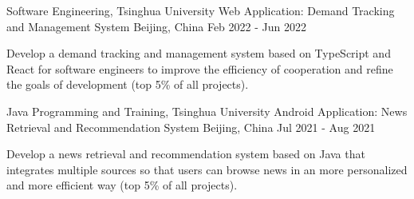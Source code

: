 

\begin{cventries}

  \cventry
    {Software Engineering, Tsinghua University} %
    {Web Application: Demand Tracking and Management System} %
    {Beijing, China} %
    {Feb 2022 - Jun 2022} %
    {
      \begin{cvitems} %
        \item {Develop a demand tracking and management system based on TypeScript and React for software engineers to improve the efficiency of cooperation and refine the goals of development (top 5\% of all projects).}
      \end{cvitems}
    }

  \cventry
    {Java Programming and Training, Tsinghua University} %
    {Android Application: News Retrieval and Recommendation System} %
    {Beijing, China} %
    {Jul 2021 - Aug 2021} %
    {
      \begin{cvitems} %
        \item {Develop a news retrieval and recommendation system based on Java that integrates multiple sources so that users can browse news in an more personalized and more efficient way (top 5\% of all projects).}
      \end{cvitems}
    }

\end{cventries}
